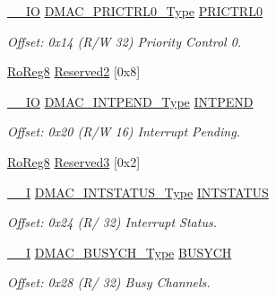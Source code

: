 \begin{DoxyCompactItemize}
\mbox{\hyperlink{core__cm0plus_8h_aec43007d9998a0a0e01faede4133d6be}{\+\_\+\+\_\+\+IO}} \mbox{\hyperlink{union_d_m_a_c___p_r_i_c_t_r_l0___type}{D\+M\+A\+C\+\_\+\+P\+R\+I\+C\+T\+R\+L0\+\_\+\+Type}} \mbox{\hyperlink{struct_dmac_a68268a89356b2aa69cc5fdac65c4cdff}{P\+R\+I\+C\+T\+R\+L0}}
\begin{DoxyCompactList}\small\item\em Offset\+: 0x14 (R/W 32) Priority Control 0. \end{DoxyCompactList}\item 
\mbox{\hyperlink{group___s_a_m_d21_e15_a__definitions_ga0d957f1433aaf5d70e4dc2b68288442d}{Ro\+Reg8}} \mbox{\hyperlink{struct_dmac_a8bdc4a639d3a39ae271ce60299b45c28}{Reserved2}} \mbox{[}0x8\mbox{]}
\item 
\mbox{\hyperlink{core__cm0plus_8h_aec43007d9998a0a0e01faede4133d6be}{\+\_\+\+\_\+\+IO}} \mbox{\hyperlink{union_d_m_a_c___i_n_t_p_e_n_d___type}{D\+M\+A\+C\+\_\+\+I\+N\+T\+P\+E\+N\+D\+\_\+\+Type}} \mbox{\hyperlink{struct_dmac_a3d322167585abb8aa35805bb00e9bf54}{I\+N\+T\+P\+E\+ND}}
\begin{DoxyCompactList}\small\item\em Offset\+: 0x20 (R/W 16) Interrupt Pending. \end{DoxyCompactList}\item 
\mbox{\hyperlink{group___s_a_m_d21_e15_a__definitions_ga0d957f1433aaf5d70e4dc2b68288442d}{Ro\+Reg8}} \mbox{\hyperlink{struct_dmac_ad07c4ef2ff7a794403c53387495e8d6d}{Reserved3}} \mbox{[}0x2\mbox{]}
\item 
\mbox{\hyperlink{core__cm0plus_8h_af63697ed9952cc71e1225efe205f6cd3}{\+\_\+\+\_\+I}} \mbox{\hyperlink{union_d_m_a_c___i_n_t_s_t_a_t_u_s___type}{D\+M\+A\+C\+\_\+\+I\+N\+T\+S\+T\+A\+T\+U\+S\+\_\+\+Type}} \mbox{\hyperlink{struct_dmac_a554dd4501cfc63278a4a2838ab2bfcfc}{I\+N\+T\+S\+T\+A\+T\+US}}
\begin{DoxyCompactList}\small\item\em Offset\+: 0x24 (R/ 32) Interrupt Status. \end{DoxyCompactList}\item 
\mbox{\hyperlink{core__cm0plus_8h_af63697ed9952cc71e1225efe205f6cd3}{\+\_\+\+\_\+I}} \mbox{\hyperlink{union_d_m_a_c___b_u_s_y_c_h___type}{D\+M\+A\+C\+\_\+\+B\+U\+S\+Y\+C\+H\+\_\+\+Type}} \mbox{\hyperlink{struct_dmac_a27fb47563710a73c606be602d1511591}{B\+U\+S\+Y\+CH}}
\begin{DoxyCompactList}\small\item\em Offset\+: 0x28 (R/ 32) Busy Channels. \end{DoxyCompactList}\item 

\end{DoxyCompactItemize}
